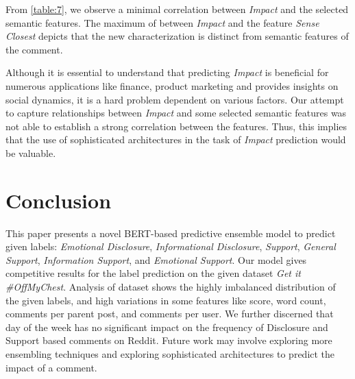 \documentclass[runningheads]{llncs}
\begin{document}
\begin{table}[]
\centering
{}
\caption{The relationship between Semantic Features and Impact, as represented by Pearson correlation coefficient, .}
\label{table:7}
\end{table}

From \autoref{table:7}, we observe a minimal correlation between \textit{Impact} and the selected semantic features. The maximum  of  between \textit{Impact} and the feature \textit{Sense Closest}\cite{HumorRecognitionPaper} depicts that the new characterization is distinct from semantic features of the comment. 

Although it is essential to understand that predicting \textit{Impact} is beneficial for numerous applications like finance, product marketing and provides insights on social dynamics, it is a hard problem dependent on various factors. Our attempt to capture relationships between \textit{Impact} and some selected semantic features was not able to establish a strong correlation between the features. Thus, this implies that the use of sophisticated architectures in the task of \textit{Impact} prediction would be valuable. 

\section{Conclusion}
This paper presents a novel BERT-based predictive ensemble model to predict given labels: \textit{Emotional Disclosure}, \textit{Informational Disclosure}, \textit{Support}, \textit{General Support}, \textit{Information Support}, and \textit{Emotional Support}. Our model gives competitive results for the label prediction on the given dataset \textit{Get it \#OffMyChest}. Analysis of dataset shows the highly imbalanced distribution of the given labels, and high variations in some features like score, word count, comments per parent post, and comments per user. We further discerned that day of the week has no significant impact on the frequency of Disclosure and Support based comments on Reddit. Future work may involve exploring more ensembling techniques and exploring sophisticated architectures to predict the impact of a comment.



\end{document}
